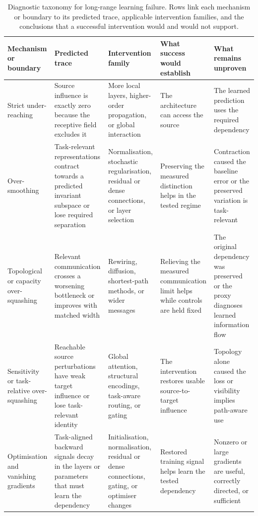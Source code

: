 \begin{table}[t]
\centering
\scriptsize
\setlength{\tabcolsep}{2.5pt}
\begin{tabular}{L{0.14\textwidth}L{0.20\textwidth}L{0.18\textwidth}L{0.20\textwidth}L{0.18\textwidth}}
\hline
\textbf{Mechanism or boundary} & \textbf{Predicted trace} & \textbf{Intervention family} & \textbf{What success would establish} & \textbf{What remains unproven} \\
\hline
Strict under-reaching & Source influence is exactly zero because the receptive field excludes it & More local layers, higher-order propagation, or global interaction & The architecture can access the source & The learned prediction uses the required dependency \\
Over-smoothing & Task-relevant representations contract towards a predicted invariant subspace or lose required separation & Normalisation, stochastic regularisation, residual or dense connections, or layer selection & Preserving the measured distinction helps in the tested regime & Contraction caused the baseline error or the preserved variation is task-relevant \\
Topological or capacity over-squashing & Relevant communication crosses a worsening bottleneck or improves with matched width & Rewiring, diffusion, shortest-path methods, or wider messages & Relieving the measured communication limit helps while controls are held fixed & The original dependency was preserved or the proxy diagnoses learned information flow \\
Sensitivity or task-relative over-squashing & Reachable source perturbations have weak target influence or lose task-relevant identity & Global attention, structural encodings, task-aware routing, or gating & The intervention restores usable source-to-target influence & Topology alone caused the loss or visibility implies path-aware use \\
Optimisation and vanishing gradients & Task-aligned backward signals decay in the layers or parameters that must learn the dependency & Initialisation, normalisation, residual or dense connections, gating, or optimiser changes & Restored training signal helps learn the tested dependency & Nonzero or large gradients are useful, correctly directed, or sufficient \\
\hline
\end{tabular}
\caption{Diagnostic taxonomy for long-range learning failure.
Rows link each mechanism or boundary to its predicted trace, applicable intervention families, and the conclusions that a successful intervention would and would not support.}
\label{tab:failure-diagnostic-synthesis}
\end{table}

